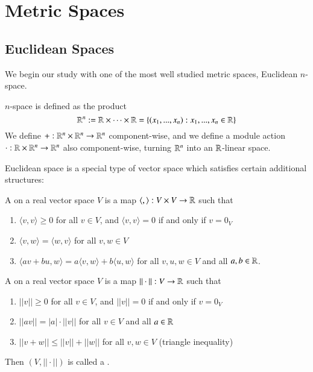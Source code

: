 \chapter{Metric Spaces}

\section{Euclidean Spaces}

We begin our study with one of the most well studied metric spaces, Euclidean $n$-space.

\begin{defn}
     $n$-space is defined as the product \begin{equation*}
        \mathbb R^n := \mathbb R\times \cdots \times \mathbb R = \{(x_1,...,x_n):x_1,...,x_n \in \mathbb R\}
    \end{equation*}
    We define $+:\mathbb R^n\times \mathbb R^n\rightarrow \mathbb R^n$ component-wise, and we define a module action $\cdot:\mathbb R\times \mathbb R^n\rightarrow \mathbb R^n$ also component-wise, turning $\mathbb R^n$ into an $\mathbb R$-linear space.
\end{defn}

Euclidean space is a special type of vector space which satisfies certain additional structures:

\begin{defn}
    A  on a real vector space $V$ is a map $\langle , \rangle: V\times V\rightarrow \mathbb R$ such that \begin{enumerate}
        \item $\langle v,v\rangle \geq 0$ for all $v \in V$, and $\langle v,v\rangle = 0$ if and only if $v = 0_V$
        \item $\langle v,w\rangle = \langle w,v\rangle$ for all $v,w \in V$
        \item $\langle av+bu,w\rangle = a\langle v,w\rangle + b\langle u,w\rangle$ for all $v,u,w \in V$ and all $a,b \in \mathbb R$.
    \end{enumerate}
\end{defn}

\begin{defn}
    A  on a real vector space $V$ is a map $||\cdot||:V\rightarrow \mathbb R$ such that \begin{enumerate}
        \item $|| v|| \geq 0$ for all $v \in V$, and $||v|| = 0$ if and only if $v = 0_V$
        \item $||av|| = |a|\cdot||v||$ for all $v \in V$ and all $a \in \mathbb R$
        \item $||v+w|| \leq ||v|| + ||w||$ for all $v,w \in V$ (triangle inequality)
    \end{enumerate}
    Then $(V,||\cdot||)$ is called a .
\end{defn}


